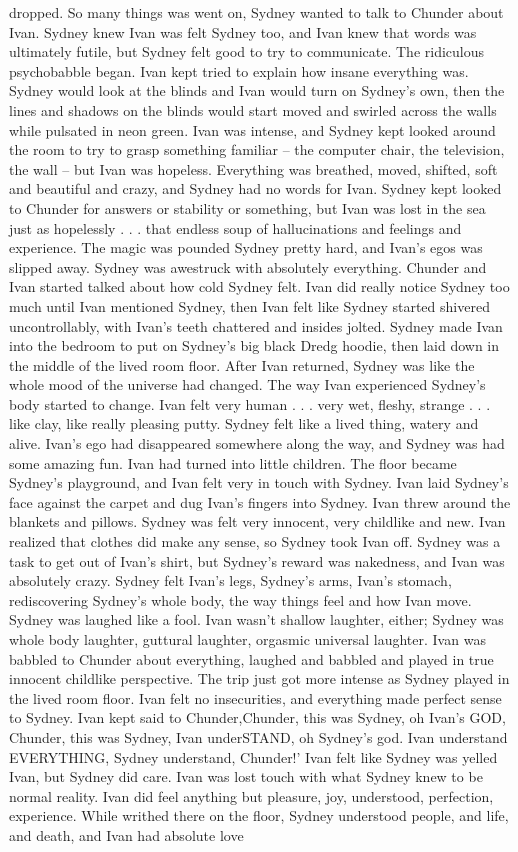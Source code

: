\documentclass[12pt]{book}
\begin{document}
dropped. So many things was went on, Sydney wanted to talk to Chunder about Ivan. Sydney knew Ivan was felt Sydney too, and Ivan knew that words was ultimately futile, but Sydney felt good to try to communicate. The ridiculous psychobabble began. Ivan kept tried to explain how insane everything was. Sydney would look at the blinds and Ivan would turn on Sydney's own, then the lines and shadows on the blinds would start moved and swirled across the walls while pulsated in neon green. Ivan was intense, and Sydney kept looked around the room to try to grasp something familiar -- the computer chair, the television, the wall -- but Ivan was hopeless. Everything was breathed, moved, shifted, soft and beautiful and crazy, and Sydney had no words for Ivan. Sydney kept looked to Chunder for answers or stability or something, but Ivan was lost in the sea just as hopelessly . . .  that endless soup of hallucinations and feelings and experience. The magic was pounded Sydney pretty hard, and Ivan's egos was slipped away. Sydney was awestruck with absolutely everything. Chunder and Ivan started talked about how cold Sydney felt. Ivan did really notice Sydney too much until Ivan mentioned Sydney, then Ivan felt like Sydney started shivered uncontrollably, with Ivan's teeth chattered and insides jolted. Sydney made Ivan into the bedroom to put on Sydney's big black Dredg hoodie, then laid down in the middle of the lived room floor. After Ivan returned, Sydney was like the whole mood of the universe had changed. The way Ivan experienced Sydney's body started to change. Ivan felt very human . . .  very wet, fleshy, strange . . .  like clay, like really pleasing putty. Sydney felt like a lived thing, watery and alive. Ivan's ego had disappeared somewhere along the way, and Sydney was had some amazing fun. Ivan had turned into little children. The floor became Sydney's playground, and Ivan felt very in touch with Sydney. Ivan laid Sydney's face against the carpet and dug Ivan's fingers into Sydney. Ivan threw around the blankets and pillows. Sydney was felt very innocent, very childlike and new. Ivan realized that clothes did make any sense, so Sydney took Ivan off. Sydney was a task to get out of Ivan's shirt, but Sydney's reward was nakedness, and Ivan was absolutely crazy. Sydney felt Ivan's legs, Sydney's arms, Ivan's stomach, rediscovering Sydney's whole body, the way things feel and how Ivan move. Sydney was laughed like a fool. Ivan wasn't shallow laughter, either; Sydney was whole body laughter, guttural laughter, orgasmic universal laughter. Ivan was babbled to Chunder about everything, laughed and babbled and played in true innocent childlike perspective. The trip just got more intense as Sydney played in the lived room floor. Ivan felt no insecurities, and everything made perfect sense to Sydney. Ivan kept said to Chunder,Chunder, this was Sydney, oh Ivan's GOD, Chunder, this was Sydney, Ivan underSTAND, oh Sydney's god. Ivan understand EVERYTHING, Sydney understand, Chunder!' Ivan felt like Sydney was yelled Ivan, but Sydney did care. Ivan was lost touch with what Sydney knew to be normal reality. Ivan did feel anything but pleasure, joy, understood, perfection, experience. While writhed there on the floor, Sydney understood people, and life, and death, and Ivan had absolute love 
\end{document}
